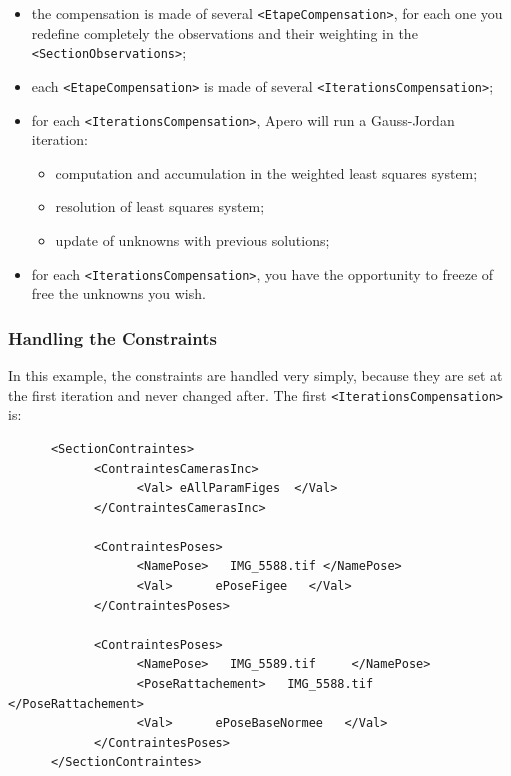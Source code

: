 \begin{itemize}
   \item the compensation is made of several  {\tt <EtapeCompensation>},
         for each one you redefine completely the observations and
         their weighting in the {\tt <SectionObservations>};

   \item  each  {\tt <EtapeCompensation>} is made of several  
         {\tt <IterationsCompensation>};

    \item for each  {\tt <IterationsCompensation>}, Apero will
     run a Gauss-Jordan iteration: 

\begin{itemize}
      \item computation  and accumulation
            in the weighted least squares system;

      \item resolution of least squares system;

      \item update of unknowns with previous solutions;
\end{itemize}

    \item for each  {\tt <IterationsCompensation>}, you have the
          opportunity to freeze of free the unknowns you wish.
\end{itemize}


\subsubsection{Handling the Constraints}

In this example, the constraints are handled very simply,
because they are set at the first iteration and never changed after.
The first {\tt  <IterationsCompensation>} is:


{\scriptsize
\begin{verbatim}
      <SectionContraintes>
            <ContraintesCamerasInc>
                  <Val> eAllParamFiges  </Val>
            </ContraintesCamerasInc>

            <ContraintesPoses>
                  <NamePose>   IMG_5588.tif </NamePose>
                  <Val>      ePoseFigee   </Val>
            </ContraintesPoses>

            <ContraintesPoses>
                  <NamePose>   IMG_5589.tif     </NamePose>
                  <PoseRattachement>   IMG_5588.tif </PoseRattachement>
                  <Val>      ePoseBaseNormee   </Val>
            </ContraintesPoses>
      </SectionContraintes>

\end{verbatim}
}

